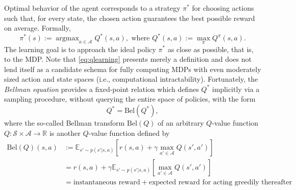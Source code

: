 \documentclass[10pt,letterpaper]{article}
\DeclareMathOperator{\argmax}{argmax}
\begin{document}
Optimal behavior of the agent corresponds to
a strategy $\pi^*$ for choosing actions such that, for every state, the chosen action guarantees the best possible reward on average. Formally,
\begin{equation}
  \pi^*(s) := \argmax_{a \in \mathcal A}{Q}^*(s, a),\text{ where }Q^*(s, a) := \max_{\pi}Q^\pi(s,a).
  \label{eq:qlearning}
\end{equation}
The learning goal is to approach the ideal
policy $\pi^*$ as close as possible, that is, to  the MDP.
Note that \eqref{eq:qlearning} presents merely a definition and
does not lend itself as a candidate schema
for fully computing MDPs with even moderately sized action and state spaces
(i.e., computational intractability).
Fortunately, the \textit{Bellman equation} \citep{sutton1998reinforcement} provides a fixed-point relation which defines $Q^*$ implicitly via a sampling procedure, without querying the entire space of policies, with the form
\begin{equation}
  Q^* = \text{Bel}(Q^*),
  \label{eq:bellman}
\end{equation}
where the so-called Bellman transform $\text{Bel}(Q)$
of an arbitrary $Q$-value function $Q: \mathcal S \times \mathcal A \rightarrow \mathbb R$  is another $Q$-value function defined by
\begin{equation}
  \begin{split}
   \text{Bel}(Q)(s,a) &:=
   \mathbb E_{s' \sim p(s'|s,a)} [r(s,a) + \gamma \max_{a' \in \mathcal A}Q(s', a')]\\
   &= r(s,a) + \gamma\mathbb E_{s' \sim p(s'|s,a)} [\max_{a' \in \mathcal A}Q(s', a')]\\
   &= \text{instantaneous reward} + \text{expected reward for acting greedily thereafter}
    \end{split}
  \end{equation}
\end{document}
